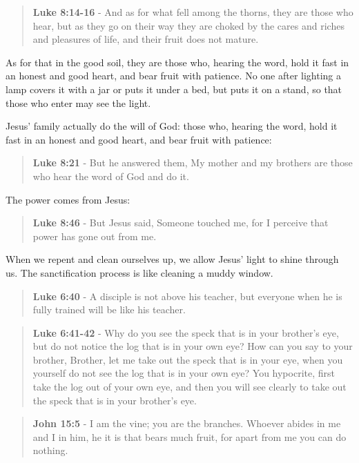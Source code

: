 \documentclass[11pt]{article}
\begin{document}
\begin{quote}
\textbf{Luke 8:14-16} - And as for what fell among the thorns, they are those who hear, but as they go on their way they are choked by the cares and riches and pleasures of life, and their fruit does not mature.
\end{quote}
As for that in the good soil, they are those who, hearing the word, hold it fast in an honest and good heart, and bear fruit with patience. No one after lighting a lamp covers it with a jar or puts it under a bed, but puts it on a stand, so that those who enter may see the light.

Jesus' family actually do the will of God: those who, hearing the word, hold it fast in an honest and good heart, and bear fruit with patience:

\begin{quote}
\textbf{Luke 8:21} - But he answered them, My mother and my brothers are those who hear the word of God and do it.
\end{quote}

The power comes from Jesus:

\begin{quote}
\textbf{Luke 8:46} - But Jesus said, Someone touched me, for I perceive that power has gone out from me.
\end{quote}

When we repent and clean ourselves up, we allow Jesus' light to shine through us. The sanctification process is like cleaning a muddy window.

\begin{quote}
\textbf{Luke 6:40} - A disciple is not above his teacher, but everyone when he is fully trained will be like his teacher.
\end{quote}

\begin{quote}
\textbf{Luke 6:41-42} - Why do you see the speck that is in your brother's eye, but do not notice the log that is in your own eye? How can you say to your brother, Brother, let me take out the speck that is in your eye, when you yourself do not see the log that is in your own eye? You hypocrite, first take the log out of your own eye, and then you will see clearly to take out the speck that is in your brother's eye.
\end{quote}

\begin{quote}
\textbf{John 15:5} - I am the vine; you are the branches. Whoever abides in me and I in him, he it is that bears much fruit, for apart from me you can do nothing.
\end{quote}
\end{document}
